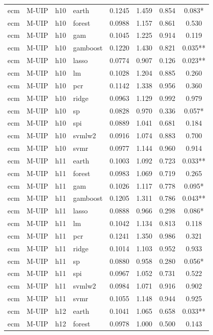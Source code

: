 \begin{ThreePartTable}
\begin{longtable}[t]{llclcccc}
\addlinespace
ecm & M-UIP & h10 & earth & 0.1245 & 1.459 & 0.854 & 0.083*\\
ecm & M-UIP & h10 & forest & 0.0988 & 1.157 & 0.861 & 0.530\\
ecm & M-UIP & h10 & gam & 0.1045 & 1.225 & 0.914 & 0.119\\
ecm & M-UIP & h10 & gamboost & 0.1220 & 1.430 & 0.821 & 0.035**\\
ecm & M-UIP & h10 & lasso & 0.0774 & 0.907 & 0.126 & 0.023**\\
ecm & M-UIP & h10 & lm & 0.1028 & 1.204 & 0.885 & 0.260\\
ecm & M-UIP & h10 & pcr & 0.1142 & 1.338 & 0.956 & 0.360\\
ecm & M-UIP & h10 & ridge & 0.0963 & 1.129 & 0.992 & 0.979\\
ecm & M-UIP & h10 & sp & 0.0828 & 0.970 & 0.336 & 0.057*\\
ecm & M-UIP & h10 & spi & 0.0889 & 1.041 & 0.681 & 0.184\\
ecm & M-UIP & h10 & svmlw2 & 0.0916 & 1.074 & 0.883 & 0.700\\
ecm & M-UIP & h10 & svmr & 0.0977 & 1.144 & 0.960 & 0.914\\
\addlinespace
ecm & M-UIP & h11 & earth & 0.1003 & 1.092 & 0.723 & 0.033**\\
ecm & M-UIP & h11 & forest & 0.0983 & 1.069 & 0.719 & 0.265\\
ecm & M-UIP & h11 & gam & 0.1026 & 1.117 & 0.778 & 0.095*\\
ecm & M-UIP & h11 & gamboost & 0.1205 & 1.311 & 0.786 & 0.043**\\
ecm & M-UIP & h11 & lasso & 0.0888 & 0.966 & 0.298 & 0.086*\\
ecm & M-UIP & h11 & lm & 0.1042 & 1.134 & 0.813 & 0.118\\
ecm & M-UIP & h11 & pcr & 0.1241 & 1.350 & 0.986 & 0.321\\
ecm & M-UIP & h11 & ridge & 0.1014 & 1.103 & 0.952 & 0.933\\
ecm & M-UIP & h11 & sp & 0.0880 & 0.958 & 0.280 & 0.056*\\
ecm & M-UIP & h11 & spi & 0.0967 & 1.052 & 0.731 & 0.522\\
ecm & M-UIP & h11 & svmlw2 & 0.0984 & 1.071 & 0.916 & 0.902\\
ecm & M-UIP & h11 & svmr & 0.1055 & 1.148 & 0.944 & 0.925\\
\addlinespace
ecm & M-UIP & h12 & earth & 0.1041 & 1.065 & 0.658 & 0.033**\\
ecm & M-UIP & h12 & forest & 0.0978 & 1.000 & 0.500 & 0.143\\

\end{longtable}
\end{ThreePartTable}
